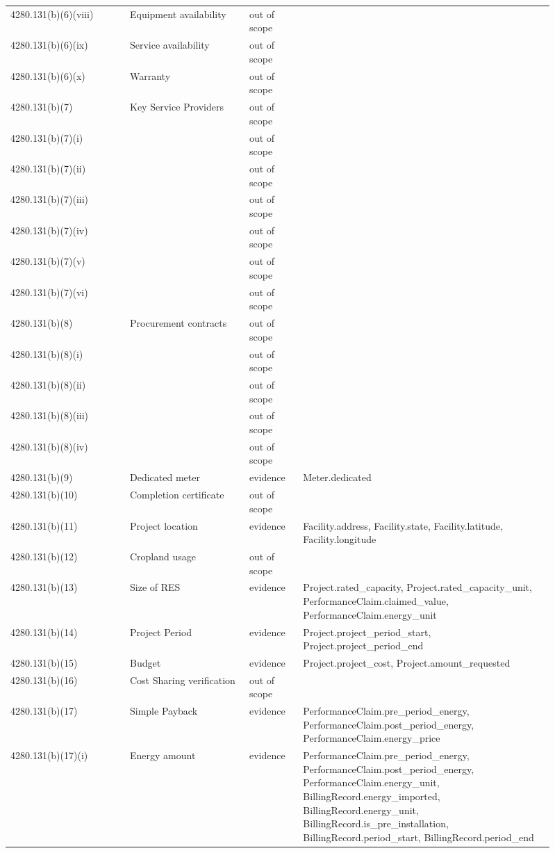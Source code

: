 \begin{longtable}{p{0.2\linewidth}p{0.2\linewidth}p{0.09\linewidth}p{0.42\linewidth}}
4280.131(b)(6)(viii) & Equipment availability & out of scope &  \\
4280.131(b)(6)(ix) & Service availability & out of scope &  \\
4280.131(b)(6)(x) & Warranty & out of scope &  \\
4280.131(b)(7) & Key Service Providers & out of scope &  \\
4280.131(b)(7)(i) &  & out of scope &  \\
4280.131(b)(7)(ii) &  & out of scope &  \\
4280.131(b)(7)(iii) &  & out of scope &  \\
4280.131(b)(7)(iv) &  & out of scope &  \\
4280.131(b)(7)(v) &  & out of scope &  \\
4280.131(b)(7)(vi) &  & out of scope &  \\
4280.131(b)(8) & Procurement contracts & out of scope &  \\
4280.131(b)(8)(i) &  & out of scope &  \\
4280.131(b)(8)(ii) &  & out of scope &  \\
4280.131(b)(8)(iii) &  & out of scope &  \\
4280.131(b)(8)(iv) &  & out of scope &  \\
4280.131(b)(9) & Dedicated meter & evidence & Meter.dedicated \\
4280.131(b)(10) & Completion certificate & out of scope &  \\
4280.131(b)(11) & Project location & evidence & Facility.address, Facility.state, Facility.latitude, Facility.longitude \\
4280.131(b)(12) & Cropland usage & out of scope &  \\
4280.131(b)(13) & Size of RES & evidence & Project.rated\_capacity, Project.rated\_capacity\_unit, PerformanceClaim.claimed\_value, PerformanceClaim.energy\_unit \\
4280.131(b)(14) & Project Period & evidence & Project.project\_period\_start, Project.project\_period\_end \\
4280.131(b)(15) & Budget & evidence & Project.project\_cost, Project.amount\_requested \\
4280.131(b)(16) & Cost Sharing verification & out of scope &  \\
4280.131(b)(17) & Simple Payback & evidence & PerformanceClaim.pre\_period\_energy, PerformanceClaim.post\_period\_energy, PerformanceClaim.energy\_price \\
4280.131(b)(17)(i) & Energy amount & evidence & PerformanceClaim.pre\_period\_energy, PerformanceClaim.post\_period\_energy, PerformanceClaim.energy\_unit, BillingRecord.energy\_imported, BillingRecord.energy\_unit, BillingRecord.is\_pre\_installation, BillingRecord.period\_start, BillingRecord.period\_end \\

\end{longtable}
